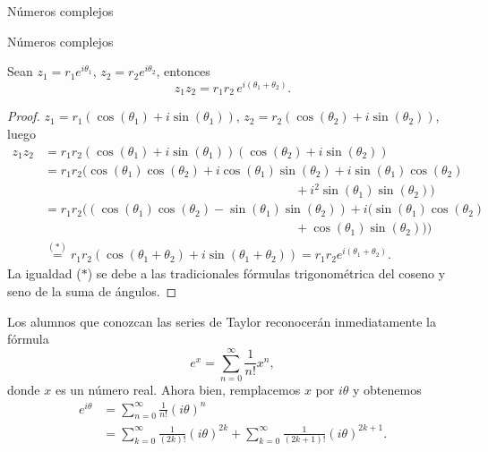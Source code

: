 \begin{chapter}{N\'umeros complejos}
\begin{section}{N\'umeros complejos}
        \begin{proposicion}
            Sean $z_1 = r_1 e^{i\theta_1}$, $z_2 = r_2 e^{i\theta_2}$,  entonces
            $$
            z_1 z_2 =  r_1r_2 \,e^{i(\theta_1+ \theta_2)}.
            $$
        \end{proposicion}
        \begin{proof}
            $z_1 = r_1(\cos(\theta_1)+i\sin(\theta_1))$, $z_2 = r_2(\cos(\theta_2)+i\sin(\theta_2))$, luego
            \begin{align*}
            z_1z_2 &= r_1r_2(\cos(\theta_1)+i\sin(\theta_1))(\cos(\theta_2)+i\sin(\theta_2)) \\
            &= r_1r_2(\cos(\theta_1)\cos(\theta_2)+i\cos(\theta_1)\sin(\theta_2)+i\sin(\theta_1)\cos(\theta_2) \\
            &\qquad\qquad\qquad\qquad\qquad\qquad\qquad\qquad\qquad\qquad+i^2\sin(\theta_1)\sin(\theta_2)) \\
            &= r_1r_2((\cos(\theta_1)\cos(\theta_2)-\sin(\theta_1)\sin(\theta_2))+i(\sin(\theta_1)\cos(\theta_2)\\
            &\qquad\qquad\qquad\qquad\qquad\qquad\qquad\qquad \qquad\qquad +\cos(\theta_1)\sin(\theta_2))) \\
            &\overset{(*)}= r_1r_2(\cos(\theta_1+\theta_2) + i\sin(\theta_1+\theta_2)) =  r_1r_2e^{i(\theta_1+ \theta_2)}.
            \end{align*}
            La igualdad ($*$) se debe a las tradicionales fórmulas trigonométrica del coseno y  seno de la suma de ángulos.
        \end{proof}
        
        
        \begin{observacion*} Los alumnos que conozcan las series de Taylor reconocerán inmediatamente la fórmula
            \begin{equation*}
                e^x = \sum_{n=0}^{\infty} \frac{1}{n!}x^n,
            \end{equation*} 
            donde $x$ es un número real. Ahora bien, remplacemos $x$ por $i\theta$ y obtenemos
            \begin{align*}
                e^{i\theta} &= \sum_{n=0}^{\infty} \frac{1}{n!}(i\theta)^n \\
                &=  \sum_{k=0}^{\infty} \frac{1}{(2k)!}(i\theta)^{2k}  + \sum_{k=0}^{\infty} \frac{1}{(2k+1)!}(i\theta)^{2k+1}. \tag{*}
            \end{align*}
        

\end{observacion*}
\end{section}
\end{chapter}
